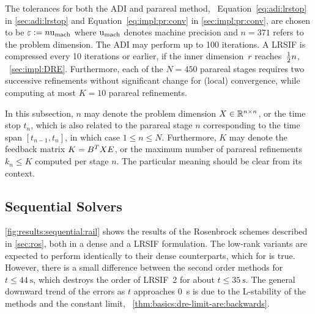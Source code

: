 The tolerances for both the \ac{ADI} and parareal method,
\cf~Equation~\eqref{eq:adi:lrstop} in \autoref{sec:adi:lrstop}
and Equation~\eqref{eq:impl:pr:conv} in \autoref{sec:impl:pr:conv},
are chosen to be $\varepsilon := n\mathrm u_\text{mach}$
where $\mathrm u_\text{mach}$ denotes machine precision
and $n=371$ refers to the problem dimension.
The \ac{ADI} may perform up to 100 iterations.
A \ac{LRSIF} is compressed every 10 iterations or earlier,
if the inner dimension~$r$ reaches~$\tfrac{1}{2} n$,
\cf~\autoref{sec:impl:DRE}.
Furthermore, each of the $N = 450$ parareal stages requires two successive refinements without significant change
for (local) convergence,
while computing at most $K = 10$ parareal refinements.

\begin{remark}
  In this subsection,
  $n$ may denote the problem dimension $X \in\mathbb{R}^{n\times n}$,
  or the time stop $t_n$,
  which is also related to the parareal stage $n$ corresponding to the time span $[t_{n-1}, t_n]$,
  in which case $1 \leq n \leq N$.
  Furthermore,
  $K$ may denote the feedback matrix \mbox{$K = B^T X E$},
  or the maximum number of parareal refinements $k_n \leq K$ computed per stage $n$.
  The particular meaning should be clear from its context.
\end{remark}

\subsection{Sequential Solvers}

\autoref{fig:results:sequential:rail} shows the results of the Rosenbrock schemes described in \autoref{sec:ros},
both in a dense and a \ac{LRSIF} formulation.
The low-rank variants are expected to perform identically to their dense counterparts,
which for  is true.
However, there is a small difference between the second order methods for $t\leq\SI{44}{\second}$,
which destroys the order of \ac{LRSIF}~2 for about $t\leq\SI{35}{\second}$.
The general downward trend of the errors as $t$ approaches \SI{0}{\second} is due to the L-stability of the methods and the constant limit,
\cf~\autoref{thm:basics:dre-limit-are:backwards}.

